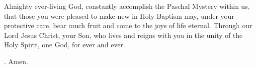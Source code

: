 \lettrine[lines=3]{A}{}lmighty ever-living God,
constantly accomplish the Paschal Mystery within us,
that those you were pleased to make new in Holy Baptism
may, under your protective care, bear much fruit
and come to the joys of life eternal.
Through our Lord Jesus Christ, your Son,
who lives and reigns with you in the unity of the Holy Spirit,
one God, for ever and ever.
\par \Rbar. Amen.
